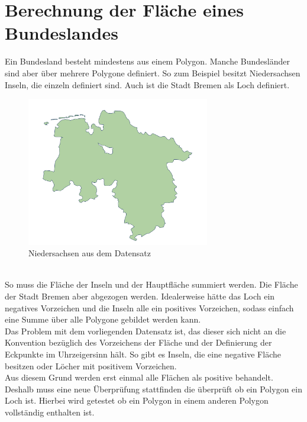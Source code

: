 \documentclass[conference]{IEEEtran}
\begin{document}
	
	\section{Berechnung der Fläche eines Bundeslandes}
	Ein Bundesland besteht mindestens aus einem Polygon. Manche Bundesländer sind aber über mehrere Polygone definiert. So zum Beispiel besitzt Niedersachsen Inseln, die einzeln definiert sind. Auch ist die Stadt Bremen als Loch definiert. 
	\begin{figure}[h]
		\begin{center}
			\includegraphics[width=8cm]{Niedersachsen.png}
			\caption{Niedersachsen aus dem Datensatz}
			\label{Niedersachsen}
		\end{center}
	\end{figure}\\
	So muss die Fläche der Inseln und der Hauptfläche summiert werden. Die Fläche der Stadt Bremen aber abgezogen werden. Idealerweise hätte das Loch ein negatives Vorzeichen und die Inseln alle ein positives Vorzeichen, sodass einfach eine Summe über alle Polygone gebildet werden kann.\\
	Das Problem mit dem vorliegenden Datensatz ist, das dieser sich nicht an die Konvention bezüglich des Vorzeichens der Fläche und der Definierung der Eckpunkte im Uhrzeigersinn hält. So gibt es Inseln, die eine negative Fläche besitzen oder Löcher mit positivem Vorzeichen.\\
	Aus diesem Grund werden erst einmal alle Flächen als positive behandelt. Deshalb muss eine neue Überprüfung stattfinden die überprüft ob ein Polygon ein Loch ist. Hierbei wird getestet ob ein Polygon in einem anderen Polygon vollständig enthalten ist.
\end{document}
